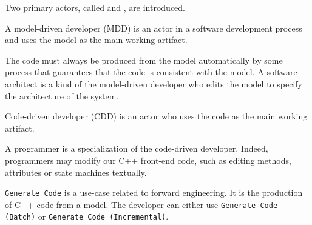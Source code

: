 Two primary actors, called 
and , are introduced.

\begin{definition}
	A model-driven developer (MDD) is an actor in a software development process and uses the model as the main working artifact.
\end{definition}

The code must always be produced from the model automatically
by some process that guarantees that the code is consistent with the model.
A software architect is a kind of the model-driven developer
who edits the model to specify the architecture of the system.

\begin{definition}
	Code-driven developer (CDD) is an actor who uses the code as the main working artifact.
\end{definition}

A programmer is a specialization of the code-driven developer.
Indeed, programmers may modify our C++ front-end code, such as editing methods, attributes or state machines textually.



\texttt{Generate Code} is a use-case related to forward engineering.
It is the production of C++ code from a model.
The developer can either use \texttt{Generate Code (Batch)} or \texttt{Generate Code (Incremental)}.

